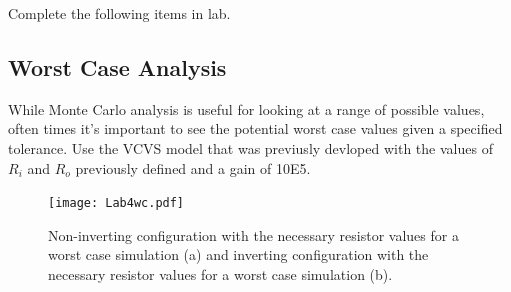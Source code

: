Complete the following items in lab.

\subsection{Worst Case Analysis} \label{ssec:4worstcase}

While Monte Carlo analysis is useful for looking at a range of possible values, often times it's important to see the potential worst case values given a specified tolerance. Use the VCVS model that was previusly devloped with the values of $R_i$ and $R_o$ previously defined and a gain of 10E5. 

\begin{figure} [h]
	\centering
		\texttt{[image: Lab4wc.pdf]}
	\caption{Non-inverting configuration with the necessary resistor values for a worst case simulation (a) and inverting configuration with the necessary resistor values for a worst case simulation (b).} \label{fig:4wcckts}
\end{figure}


